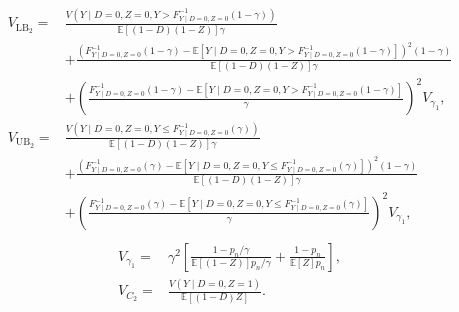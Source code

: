 \documentclass[12pt]{article}
\theoremstyle{plain}
\theoremstyle{definition}
\theoremstyle{remark}
\begin{document}
\begin{equation*}
    \begin{aligned}
        V_{\operatorname{LB}_2} =& \frac{V(Y \mid D = 0, Z = 0, Y > F^{-1}_{Y \mid D = 0, Z = 0} (1 - \gamma))}{\mathbb{E}[(1 - D)(1 - Z)] \gamma} \\
        &+ \frac{(F^{-1}_{Y \mid D = 0, Z = 0} (1 - \gamma) - \mathbb{E}[Y \mid D = 0, Z = 0, Y > F^{-1}_{Y \mid D = 0, Z = 0} (1 - \gamma)])^2 (1 - \gamma)}{\mathbb{E}[(1 - D)(1 - Z)] \gamma} \\
        &+ \left(\frac{F^{-1}_{Y \mid D = 0, Z = 0} (1 - \gamma) - \mathbb{E}[Y \mid D = 0, Z = 0, Y > F^{-1}_{Y \mid D = 0, Z = 0} (1 - \gamma)]}{\gamma}\right)^2 V_{\gamma_1}, \\
        V_{\operatorname{UB}_2} =& \frac{V(Y \mid D = 0, Z = 0, Y \leq F^{-1}_{Y \mid D = 0, Z = 0} (\gamma))}{\mathbb{E}[(1 - D)(1 - Z)] \gamma} \\
        &+ \frac{(F^{-1}_{Y \mid D = 0, Z = 0}(\gamma) - \mathbb{E}[Y \mid D = 0, Z = 0, Y \leq F^{-1}_{Y \mid D = 0, Z = 0} (\gamma)])^2 (1 - \gamma)}{\mathbb{E}[(1 - D)(1 - Z)] \gamma} \\
        &+ \left(\frac{F^{-1}_{Y \mid D = 0, Z = 0}(\gamma) - \mathbb{E}[Y \mid D = 0, Z = 0, Y \leq F^{-1}_{Y \mid D = 0, Z = 0} (\gamma)]}{\gamma}\right)^2 V_{\gamma_1}, \\
    \end{aligned}
\end{equation*}
\begin{equation*}
    \begin{aligned}
        V_{\gamma_1} =& \gamma^2 \left[\frac{1 - p_n / \gamma}{\mathbb{E}[(1 - Z)] p_n / \gamma} + \frac{1 - p_n}{\mathbb{E}[Z] p_n}\right], \\
        V_{C_2} =& \frac{V(Y \mid D = 0, Z = 1)}{\mathbb{E}[(1 - D) Z]}.
    \end{aligned}
\end{equation*}
\end{document}
